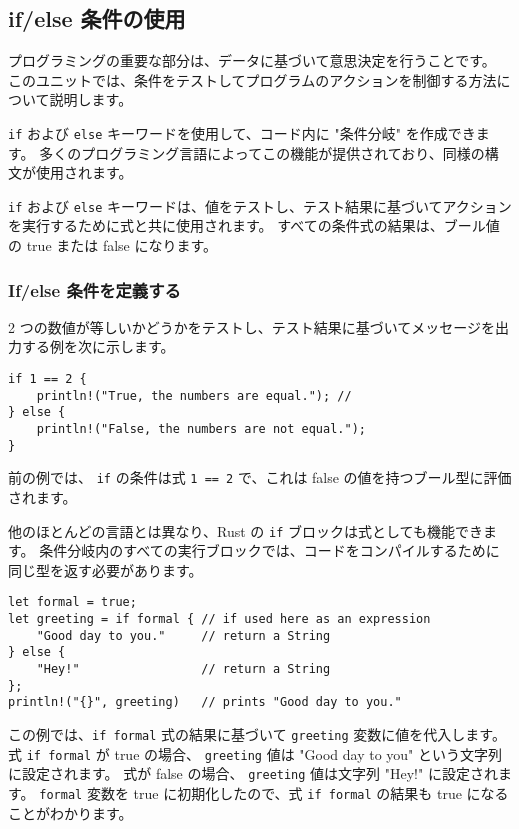 \subsection{if/else 条件の使用}


プログラミングの重要な部分は、データに基づいて意思決定を行うことです。 このユニットでは、条件をテストしてプログラムのアクションを制御する方法について説明します。

\texttt{if} および \texttt{else} キーワードを使用して、コード内に "条件分岐" を作成できます。 多くのプログラミング言語によってこの機能が提供されており、同様の構文が使用されます。

\texttt{if} および \texttt{else} キーワードは、値をテストし、テスト結果に基づいてアクションを実行するために式と共に使用されます。 すべての条件式の結果は、ブール値の true または false になります。

\subsubsection{If/else 条件を定義する}

2 つの数値が等しいかどうかをテストし、テスト結果に基づいてメッセージを出力する例を次に示します。



\begin{lstlisting}[numbers=none]
if 1 == 2 {
    println!("True, the numbers are equal."); // 
} else {
    println!("False, the numbers are not equal.");
}
\end{lstlisting}

前の例では、 \texttt{if} の条件は式 \texttt{1 == 2} で、これは false の値を持つブール型に評価されます。

他のほとんどの言語とは異なり、Rust の \texttt{if} ブロックは式としても機能できます。 条件分岐内のすべての実行ブロックでは、コードをコンパイルするために同じ型を返す必要があります。



\begin{lstlisting}[numbers=none]
let formal = true;
let greeting = if formal { // if used here as an expression
    "Good day to you."     // return a String
} else {
    "Hey!"                 // return a String
};
println!("{}", greeting)   // prints "Good day to you."
\end{lstlisting}

この例では、\texttt{if formal} 式の結果に基づいて \texttt{greeting} 変数に値を代入します。 式 \texttt{if formal} が true の場合、 \texttt{greeting} 値は "Good day to you" という文字列に設定されます。 式が false の場合、 \texttt{greeting} 値は文字列 "Hey!" に設定されます。 \texttt{formal} 変数を true に初期化したので、式 \texttt{if formal} の結果も true になることがわかります。

